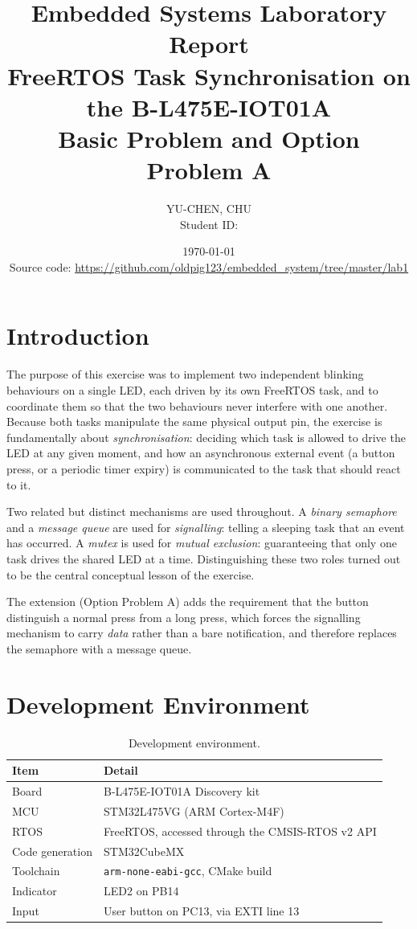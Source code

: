 \documentclass[11pt,a4paper]{article}
\title{Embedded Systems Laboratory Report\\
       \large FreeRTOS Task Synchronisation on the B-L475E-IOT01A\\
       \normalsize Basic Problem and Option Problem A}
\author{YU-CHEN, CHU\\
        \normalsize Student ID: \studentid}
\date{\today\\[2ex]
      \normalsize Source code:
      \url{https://github.com/oldpig123/embedded_system/tree/master/lab1}}
\begin{document}
\maketitle
\tableofcontents
\newpage

\section{Introduction}

The purpose of this exercise was to implement two independent blinking
behaviours on a single LED, each driven by its own FreeRTOS task, and to
coordinate them so that the two behaviours never interfere with one another.
Because both tasks manipulate the same physical output pin, the exercise is
fundamentally about \emph{synchronisation}: deciding which task is allowed to
drive the LED at any given moment, and how an asynchronous external event
(a button press, or a periodic timer expiry) is communicated to the task that
should react to it.

Two related but distinct mechanisms are used throughout. A \emph{binary
semaphore} and a \emph{message queue} are used for \emph{signalling}: telling a
sleeping task that an event has occurred. A \emph{mutex} is used for
\emph{mutual exclusion}: guaranteeing that only one task drives the shared LED
at a time. Distinguishing these two roles turned out to be the central
conceptual lesson of the exercise.

The extension (Option Problem A) adds the requirement that the button
distinguish a normal press from a long press, which forces the signalling
mechanism to carry \emph{data} rather than a bare notification, and therefore
replaces the semaphore with a message queue.

\section{Development Environment}

\begin{table}[h]
\centering
\begin{tabular}{ll}
\toprule
Item & Detail \\
\midrule
Board            & B-L475E-IOT01A Discovery kit \\
MCU              & STM32L475VG (ARM Cortex-M4F) \\
RTOS             & FreeRTOS, accessed through the CMSIS-RTOS v2 API \\
Code generation  & STM32CubeMX \\
Toolchain        & \texttt{arm-none-eabi-gcc}, CMake build \\
Indicator        & LED2 on PB14 \\
Input            & User button on PC13, via EXTI line 13 \\
\bottomrule
\end{tabular}
\caption{Development environment.}
\end{table}
\end{document}
